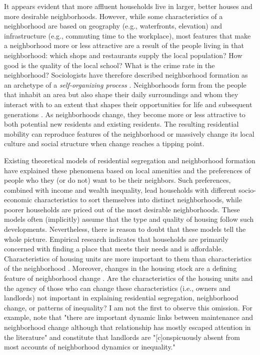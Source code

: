 \documentclass[a4paper,12pt]{article}
\begin{document}
It appears evident that more affluent households live in larger, better houses and more desirable neighborhoods. However, while some characteristics of a neighborhood are based on geography (e.g., waterfronts, elevation) and infrastructure (e.g., commuting time to the workplace), most features that make a neighborhood more or less attractive are a result of the people living in that neighborhood: which shops and restaurants supply the local population? How good is the quality of the local school? What is the crime rate in the neighborhood? Sociologists have therefore described neighborhood formation as an archetype of a \textit{self-organizing process} \citep{schellingDynamicModelsSegregation1971, galsterNatureNeighbourhood2001, fossettEthnicPreferencesSocial2006}. Neighborhoods form from the people that inhabit an area but also shape their daily surroundings and whom they interact with to an extent that shapes their opportunities for life \citep{sampsonAssessingNeighborhoodEffects2002, sharkeyWhereWhenWhy2014, chettyImpactsNeighborhoodsIntergenerational2018a} and subsequent generations \citep{sharkeyIntergenerationalTransmissionContext2008}. As neighborhoods change, they become more or less attractive to both potential new residents and existing residents. The resulting residential mobility can reproduce features of the neighborhood or massively change its local culture and social structure when change reaches a tipping point.

Existing theoretical models of residential segregation and neighborhood formation have explained these phenomena based on local amenities and the preferences of people who they (or do not) want to be their neighbors. Such preferences, combined with income and wealth inequality, lead households with different socio-economic characteristics to sort themselves into distinct neighborhoods, while poorer households are priced out of the most desirable neighborhoods. These models often (implicitly) assume that the type and quality of housing follow such developments. Nevertheless, there is reason to doubt that these models tell the whole picture. Empirical research indicates that households are primarily concerned with finding a place that meets their needs and is affordable. Characteristics of housing units are more important to them than characteristics of the neighborhood \citep{chauCriticalReviewLiterature2003, bayerEquilibriumModelSorting2004, mummoloWhyPartisansNot2017, delucaNotJustLateral2020}. Moreover, changes in the housing stock are a defining feature of neighborhood change \citep{redfernWhatMakesGentrification2003}. Are the characteristics of the housing units and the agency of those who can change these characteristics (i.e., owners and landlords) not important in explaining residential segregation, neighborhood change, or patterns of inequality? I am not the first to observe this omission. For example, \citet[1081]{rosenthalChangePersistenceEconomic2015} note that "there are important dynamic links between maintenance and neighborhood change although that relationship has mostly escaped attention in the literature" and \citet[1093]{desmondPoorPayMore2019} constitute that landlords are "[c]onspicuously absent from most accounts of neighborhood dynamics or inequality."
\end{document}
